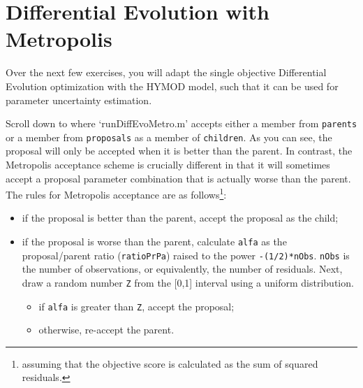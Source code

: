 




\section{Differential Evolution with Metropolis}

Over the next few exercises, you will adapt the single objective Differential
Evolution optimization with the HYMOD model, such that it can be used for
parameter uncertainty estimation.  



Scroll down to where `runDiffEvoMetro.m' accepts either a member from
\texttt{parents} or a member from \texttt{proposals} as a member of
\texttt{children}. As you can see, the proposal will only be accepted when it is
better than the parent. In contrast, the Metropolis acceptance scheme is
crucially different in that it will sometimes accept a proposal parameter
combination that is actually worse than the parent. The rules for Metropolis
acceptance are as follows\footnote{assuming that the objective score is
calculated as the sum of squared residuals.}:
\begin{itemize}
\item{if the proposal is better than the parent, accept the proposal as the
child;}
\item{if the proposal is worse than the parent, calculate \texttt{alfa} as the
proposal/parent ratio (\texttt{ratioPrPa}) raised to the power
\texttt{-(1/2)*nObs}. \texttt{nObs} is the number of observations, or
equivalently, the number of residuals. Next, draw a random number \texttt{Z}
from the [0,1] interval using a uniform distribution.}
\begin{itemize}
\item{if \texttt{alfa} is greater than \texttt{Z}, accept the proposal;}
\item{otherwise, re-accept the parent.}
\end{itemize}
\end{itemize}

